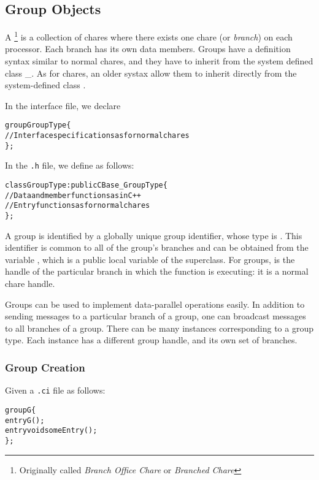 \subsection{Group Objects}
\label{sec:group}

A \footnote{Originally called {\em Branch Office Chare} or 
{\em Branched Chare}} is a collection of chares where 
there exists one chare (or {\sl branch}) on each
processor.   Each branch has its own data members.  Groups have
a definition syntax similar to normal chares,
and they have to inherit from the system defined class \_.
As for chares, an older systax allow them to inherit directly from the
system-defined class .

In the interface file, we declare

\begin{alltt}
 group GroupType \{
   // Interface specifications as for normal chares
 \};
\end{alltt}

In the \texttt{.h} file, we define  as follows:

\begin{alltt}
 class GroupType : public CBase\_GroupType \{
  // Data and member functions as in C++
  // Entry functions as for normal chares
 \};
\end{alltt}

A group is identified by a globally unique group identifier, whose type is
. This identifier is common to all of the group's branches and
can be obtained from the variable , which is a public local
variable of the  superclass.  For groups,  is the
handle of the particular branch in which the function is executing: it is a
normal chare handle.

Groups can be used to implement data-parallel operations easily.  In addition
to sending messages to a particular branch of a group, one can broadcast
messages to all branches of a group.  There can be many instances corresponding
to a group type.  Each instance has a different group handle, and its own set
of branches.

\subsubsection{Group Creation}

Given a \texttt{.ci} file as follows:

\begin{alltt}
group G \{
  entry G();
  entry void someEntry();
\};
\end{alltt}

